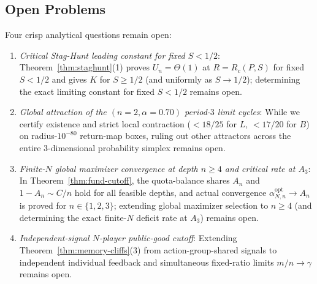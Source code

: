 \documentclass[11pt,reqno]{amsart}
\theoremstyle{definition}
\theoremstyle{remark}
\begin{document}
\subsection*{Open Problems}
Four crisp analytical questions remain open:
\begin{enumerate}
  \item \emph{Critical Stag-Hunt leading constant for fixed $S < 1/2$}: Theorem~\ref{thm:staghunt}(1) proves $U_n = \Theta(1)$ at $R = R_c(P,S)$ for fixed $S < 1/2$ and gives $K$ for $S \ge 1/2$ (and uniformly as $S \to 1/2$); determining the exact limiting constant for fixed $S < 1/2$ remains open.
  \item \emph{Global attraction of the $(n=2, \alpha=0.70)$ period-$3$ limit cycles}: While we certify existence and strict local contraction ($< 18/25$ for $L$, $< 17/20$ for $B$) on radius-$10^{-80}$ return-map boxes, ruling out other attractors across the entire $3$-dimensional probability simplex remains open.
  \item \emph{Finite-$N$ global maximizer convergence at depth $n \ge 4$ and critical rate at $A_3$}: In Theorem~\ref{thm:fund-cutoff}, the quota-balance shares $A_n$ and $1-A_n \sim C/n$ hold for all feasible depths, and actual convergence $\alpha_{N,n}^{\mathrm{opt}} \to A_n$ is proved for $n \in \{1, 2, 3\}$; extending global maximizer selection to $n \ge 4$ (and determining the exact finite-$N$ deficit rate at $A_3$) remains open.
  \item \emph{Independent-signal $N$-player public-good cutoff}: Extending Theorem~\ref{thm:memory-cliffs}(3) from action-group-shared signals to independent individual feedback and simultaneous fixed-ratio limits $m/n \to \gamma$ remains open.
\end{enumerate}
\end{document}
